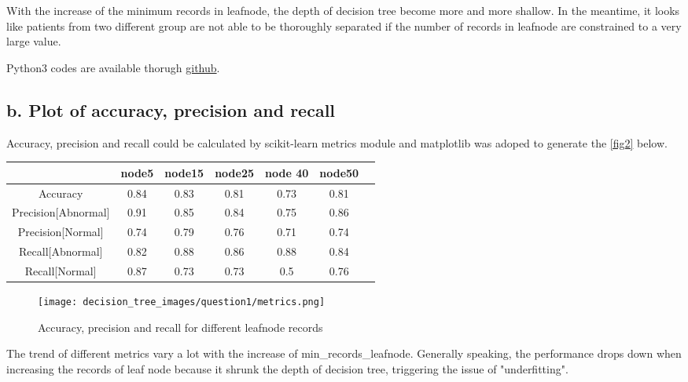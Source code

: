 \documentclass{article}
\begin{document}
With the increase of the minimum records in leafnode, the depth of decision tree become more and more shallow. In the meantime, it looks like patients from two different group are not able to be thoroughly separated if the number of records in leafnode are constrained to a very large value.

Python3 codes are available thorugh \href{https://github.com/frankligy/exercise_codes/blob/master/hw1_desicion_tree.py}{github}.

\subsection*{b. Plot of accuracy, precision and recall}
Accuracy, precision and recall could be calculated by scikit-learn metrics module and matplotlib was adoped to generate the \autoref{fig2} below.
\begin{center}
    \begin{tabular}{|c|c|c|c|c|c|c|}   %
    \hline   %
     & node5 & node15 & node25 &node 40 & node50 \\
    \hline
    Accuracy & 0.84 & 0.83 & 0.81 & 0.73 & 0.81\\
    \hline
    Precision[Abnormal] & 0.91 & 0.85 & 0.84 & 0.75 & 0.86\\
    \hline
    Precision[Normal] & 0.74 & 0.79 & 0.76 & 0.71 & 0.74\\
    \hline
    Recall[Abnormal] & 0.82 & 0.88 & 0.86 & 0.88 & 0.84\\
    \hline
    Recall[Normal]& 0.87 & 0.73& 0.73 & 0.5& 0.76\\
    \hline
    \end{tabular}
\end{center}


\begin{figure}[H]  %
    \centering
    \texttt{[image: decision\_tree\_images/question1/metrics.png]}   %
    \caption{Accuracy, precision and recall for different leafnode records}
    \label{fig2}
\end{figure}

The trend of different metrics vary a lot with the increase of min\_records\_leafnode. Generally speaking, the performance drops down when increasing the records of leaf node because it shrunk the depth of decision tree, triggering the issue of "underfitting".
\end{document}
